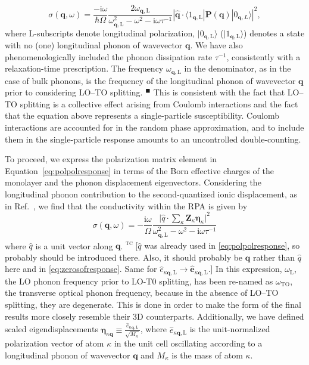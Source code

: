\documentclass[aps,prb,twocolumn,
	           groupedaddress,superscriptaddress,
               amsfonts,amssymb,amsmath,floatfix,
	           citeautoscript]{revtex4-1}
\newcommand{\iu}{\mathrm{i}}
\newcommand{\comment}[2]{%
    \ifbool{togglecomments}%
    {\textcolor{blue!70!black}{\small\textsf{%
    \textsuperscript{\textsc{\textsf{\MakeLowercase{#1}}}}%
    [#2]}}} %
    {}}     %
\newcommand{\citeremind}[1]{%
	\unskip%
    \textcolor{blue!75!black!80!yellow}{${}^\blacksquare$%
	\ifthenelse{\isempty{#1}}{}{\textsuperscript{\tiny\textsf{#1}}}%
	}\xspace}
\begin{document}
\begin{equation}
    \sigma(\mathbf{q},\omega) = \frac{-\iu\omega}{\hbar\Omega} \frac{2\omega_{\mathbf{q},\mathrm{L}}}{\omega^2_{\mathbf{q},\mathrm{L}}-\omega^2-\iu\omega\tau^{-1}}|\hat{\mathbf{q}}\cdot\langle 1_{\mathbf{q},\mathrm{L}}|\mathbf{P}(\mathbf{q})|0_{\mathbf{q},L}\rangle|^2,
    \label{eq:polpolresponse}
\end{equation}
where L-subscripts denote longitudinal polarization, $|0_{\mathbf{q},\mathrm{L}}\rangle$ ($|1_{\mathbf{q},\mathrm{L}}\rangle$) denotes a state with no (one) longitudinal phonon of wavevector $\mathbf{q}$. We have also phenomenologically included the phonon dissipation rate $\tau^{-1}$, consistently with  a relaxation-time prescription.  The frequency $\omega_{\mathbf{q},\mathrm{L}}$ in the denominator, as in the case of bulk phonons, is the frequency of the longitudinal phonon of wavevector $\mathbf{q}$ prior to considering LO--TO splitting.\citeremind{}
This is consistent with the fact that LO--TO splitting is a collective effect arising from Coulomb interactions and the fact that the equation above represents a single-particle susceptibility. Coulomb interactions are accounted for in the random phase approximation, and to include them in the single-particle response amounts to an uncontrolled double-counting. 


To proceed, we express the polarization matrix element in Equation~\eqref{eq:polpolresponse} in terms of the Born effective charges of the monolayer and the phonon displacement eigenvectors. Considering the longitudinal phonon contribution to the second-quantized ionic displacement, as in Ref.~, we find that the conductivity within the RPA is given by
\begin{equation}
    \sigma(\mathbf{q},\omega) = -\frac{\iu\omega }{\Omega}\frac{\Big|\hat{q}\cdot\sum\limits_{\kappa}\mathbf{Z}_{\kappa}\boldsymbol{\eta}_{\kappa} \Big|^2}{\omega^2_{\mathbf{q},\mathrm{L}}-\omega^2-\iu\omega\tau^{-1}}
    \label{eq:conductivity_simplified}
\end{equation}
where $\hat{q}$ is a unit vector along $\mathbf{q}$.
  \comment{tc}{$\hat{q}$ was already used in \eqref{eq:polpolresponse}, so probably should be introduced there. Also, it should probably be $\hat{\mathbf{q}}$ rather than $\hat{q}$ here and in \eqref{eq:zerosofresponse}. 
  Same for $\hat{e}_{\kappa\mathbf{q},\mathrm{L}} \rightarrow \hat{\mathbf{e}}_{\kappa\mathbf{q},\mathrm{L}}$.}
In this expression, $\omega_\mathrm{L}$, the LO phonon frequency prior to LO-T0 splitting, has been re-named as $\omega_{\mathrm{TO}}$, the transverse optical phonon frequency, because in the absence of LO--TO splitting, they are degenerate. This is done in order to make the form of the final results more closely resemble their 3D counterparts. 
Additionally, we have defined scaled eigendisplacements $\boldsymbol{\eta}_{\kappa\mathbf{q}}\equiv \frac{\hat{e}_{\kappa\mathbf{q},\mathrm{L}}}{\sqrt{M_{\kappa}}}$, where $\hat{e}_{\kappa\mathbf{q},\mathrm{L}}$ is the unit-normalized polarization vector of atom $\kappa$ in the unit cell oscillating according to a longitudinal phonon of wavevector $\mathbf{q}$ and $M_{\kappa}$ is the mass of atom $\kappa$. 
\end{document}
